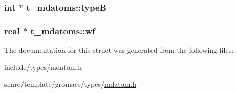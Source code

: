 \hypertarget{structt__mdatoms_a1566a9153eb9b12b005a530535d0da95}{
\subsubsection[{type\-B}]{\setlength{\rightskip}{0pt plus 5cm}int $\ast$ {\bf t\-\_\-mdatoms\-::type\-B}}}\label{structt__mdatoms_a1566a9153eb9b12b005a530535d0da95}
\hypertarget{structt__mdatoms_a0756cb6a32cf79b4b2714241aa82ac24}{
\subsubsection[{wf}]{\setlength{\rightskip}{0pt plus 5cm}real $\ast$ {\bf t\-\_\-mdatoms\-::wf}}}\label{structt__mdatoms_a0756cb6a32cf79b4b2714241aa82ac24}


\-The documentation for this struct was generated from the following files\-:\begin{DoxyCompactItemize}
\item 
include/types/\hyperlink{include_2types_2mdatom_8h}{mdatom.\-h}\item 
share/template/gromacs/types/\hyperlink{share_2template_2gromacs_2types_2mdatom_8h}{mdatom.\-h}\end{DoxyCompactItemize}
